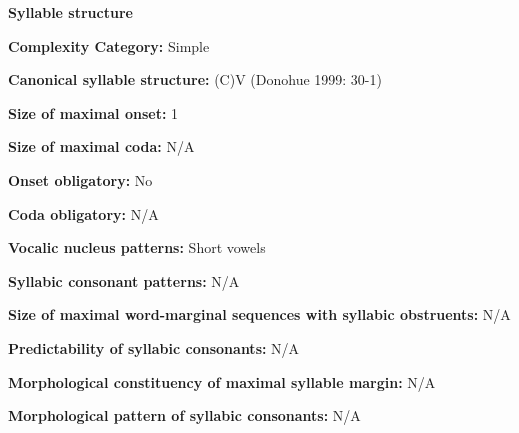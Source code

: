 \begin{styleBody}
\textbf{Syllable structure}
\end{styleBody}

\begin{styleBody}
\textbf{Complexity Category:} Simple
\end{styleBody}

\begin{styleBody}
\textbf{Canonical syllable structure:} (C)V\textbf{ }(Donohue 1999: 30-1)
\end{styleBody}

\begin{styleBody}
\textbf{Size of maximal onset:} 1
\end{styleBody}

\begin{styleBody}
\textbf{Size of maximal coda:} N/A
\end{styleBody}

\begin{styleBody}
\textbf{Onset obligatory:} No
\end{styleBody}

\begin{styleBody}
\textbf{Coda obligatory:} N/A
\end{styleBody}

\begin{styleBody}
\textbf{Vocalic nucleus patterns:} Short vowels
\end{styleBody}

\begin{styleBody}
\textbf{Syllabic consonant patterns:} N/A
\end{styleBody}

\begin{styleBody}
\textbf{Size of maximal word{}-marginal sequences with syllabic obstruents:} N/A
\end{styleBody}

\begin{styleBody}
\textbf{Predictability of syllabic consonants:} N/A
\end{styleBody}

\begin{styleBody}
\textbf{Morphological constituency of maximal syllable margin:} N/A
\end{styleBody}

\begin{styleBody}
\textbf{Morphological pattern of syllabic consonants:} N/A
\end{styleBody}

